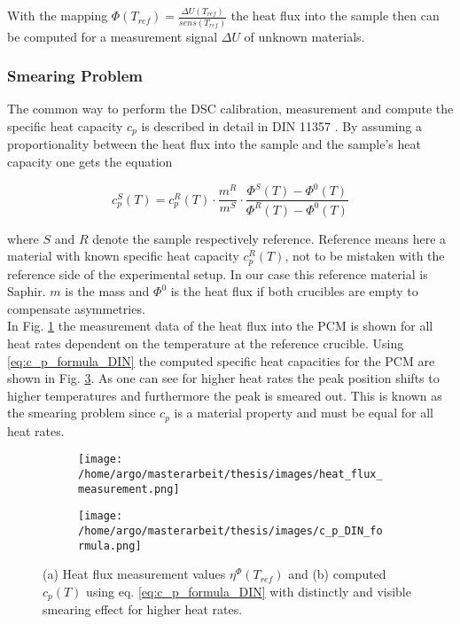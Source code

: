 \documentclass{scrartcl}[12pt, halfparskip]
\begin{document}
With the mapping $\Phi(T_{ref}) = \frac{\Delta U(T_{ref})}{sens(T_{ref})}$ the heat flux into the sample then can be computed for a measurement signal $\Delta U$ of unknown materials. 




\subsubsection{Smearing Problem}
\label{sec:smearing_problem}
The common way to perform the DSC calibration, measurement and compute the specific heat capacity $c_p$ is described in detail in DIN 11357 \cite{DIN_11357}. By assuming a proportionality between the heat flux into the sample and the sample's heat capacity one gets the equation

\begin{equation}
	c_p^S(T) = c_p^{R}(T) \cdot \frac{m^R}{m^S} \cdot \frac{\Phi^S(T) - \Phi^0(T)}{\Phi^R(T) - \Phi^0(T)}
	\label{eq:c_p_formula_DIN}
\end{equation}

where $S$ and $R$ denote the sample respectively reference. Reference means here a material with known specific heat capacity $c_p^R(T)$, not to be mistaken with the reference side of the experimental setup. In our case this reference material is Saphir. $m$ is the mass and $\Phi^0$ is the heat flux if both crucibles are empty to compensate asymmetries. \\
In Fig. \ref{fig:heat_flux_measurements} the measurement data of the heat flux into the PCM is shown for all heat rates dependent on the temperature at the reference crucible. Using \eqref{eq:c_p_formula_DIN} the computed specific heat capacities for the PCM are shown in Fig. \ref{fig:c_p_DIN_formula}. As one can see for higher heat rates the peak position shifts to higher temperatures and furthermore the peak is smeared out. This is known as the smearing problem since $c_p$ is a material property and must be equal for all heat rates.


\begin{figure}[H]
	\centering
	\begin{subfigure}{0.7\textwidth}
		\texttt{[image: /home/argo/masterarbeit/thesis/images/heat\_flux\_measurement.png]}
		\caption{}
		\label{fig:heat_flux_measurements}
	\end{subfigure}
	\begin{subfigure}{0.7\textwidth}
		\texttt{[image: /home/argo/masterarbeit/thesis/images/c\_p\_DIN\_formula.png]}
		\caption{}
		\label{fig:c_p_DIN_formula}
	\end{subfigure}
	\caption{(a) Heat flux measurement values $\eta^{\varPhi}(T_{ref})$ and (b) computed $c_p(T)$ using eq. \eqref{eq:c_p_formula_DIN} with distinctly and visible smearing effect for higher heat rates.}
\end{figure}
\end{document}
